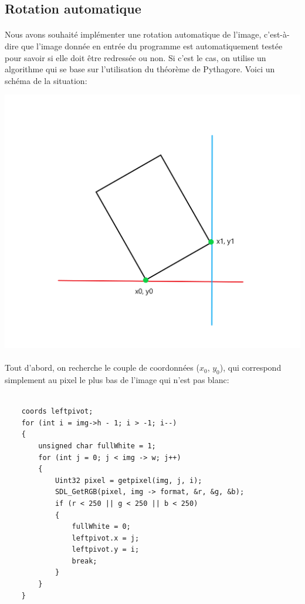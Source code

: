 \documentclass{article}
\begin{document}
\subsection{Rotation automatique}
\paragraph{}
Nous avons souhaité implémenter une rotation automatique de l'image, c'est-à-dire que l'image donnée en entrée du programme est automatiquement testée pour savoir si elle doit être redressée ou non. Si c'est le cas, on utilise un algorithme qui se base sur l'utilisation du théorème de Pythagore. Voici un schéma de la situation: \\

    \begin{center}
    	\includegraphics[scale=0.35]{Schema-rotation.png}
    \end{center}
    
\paragraph{}
Tout d'abord, on recherche le couple de coordonnées ($x_0$, $y_0$), qui correspond simplement au pixel le plus bas de l'image qui n'est pas blanc: \\


\begin{lstlisting}

    coords leftpivot;
    for (int i = img->h - 1; i > -1; i--)
    {
        unsigned char fullWhite = 1;
        for (int j = 0; j < img -> w; j++)
        {
            Uint32 pixel = getpixel(img, j, i);
            SDL_GetRGB(pixel, img -> format, &r, &g, &b);
            if (r < 250 || g < 250 || b < 250)
            {
                fullWhite = 0;
                leftpivot.x = j;
                leftpivot.y = i;
                break;
            }
        }
    }
\end{lstlisting}
\end{document}
